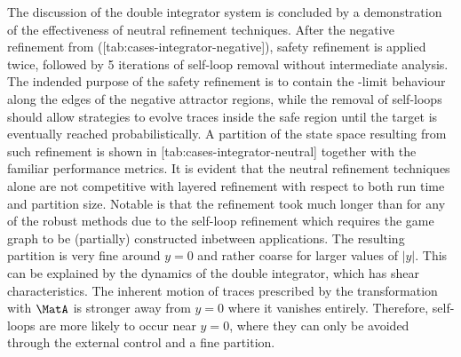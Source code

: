 \stopsubsection

\startsubsection[title={Neutral Refinement},reference=sec:cases-integrator-neutral]


    The discussion of the double integrator system is concluded by a demonstration of the effectiveness of neutral refinement techniques.
    After the negative refinement from ([tab:cases-integrator-negative]), safety refinement is applied twice, followed by 5 iterations of self-loop removal without intermediate analysis.
    The indended purpose of the safety refinement is to contain the \epsilon-limit behaviour along the edges of the negative attractor regions, while the removal of self-loops should allow strategies to evolve traces inside the safe region until the target is eventually reached probabilistically.
    A partition of the state space resulting from such refinement is shown in [tab:cases-integrator-neutral] together with the familiar performance metrics.
    It is evident that the neutral refinement techniques alone are not competitive with layered refinement with respect to both run time and partition size.
    Notable is that the refinement took much longer than for any of the robust methods due to the self-loop refinement which requires the game graph to be (partially) constructed inbetween applications.
    The resulting partition is very fine around $y = 0$ and rather coarse for larger values of $|y|$.
    This can be explained by the dynamics of the double integrator, which has shear characteristics.
    The inherent motion of traces prescribed by the transformation with $\MatA$ is stronger away from $y = 0$ where it vanishes entirely.
    Therefore, self-loops are more likely to occur near $y = 0$, where they can only be avoided through the external control and a fine partition.

\stopsubsection

